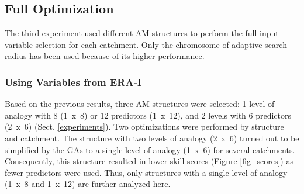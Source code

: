 \documentclass[draft]{agujournal2019}
\begin{document}
\FloatBarrier

\subsection{Full Optimization}
\label{best_multi}

The third experiment used different AM structures to perform the full input variable selection for each catchment. Only the chromosome of adaptive search radius has been used because of its higher performance.

\subsubsection{Using Variables from ERA-I}

Based on the previous results, three AM structures were selected: 1 level of analogy with 8 (1~x~8) or 12 predictors (1~x~12), and 2 levels with 6 predictors (2~x~6) (Sect. \ref{experiments}). Two optimizations were performed by structure and catchment. The structure with two levels of analogy (2~x~6) turned out to be simplified by the GAs to a single level of analogy (1~x~6) for several catchments. Consequently, this structure resulted in lower skill scores (Figure \ref{fig_scores}) as fewer predictors were used. Thus, only structures with a single level of analogy (1~x~8 and 1~x~12) are further analyzed here. 
\end{document}
